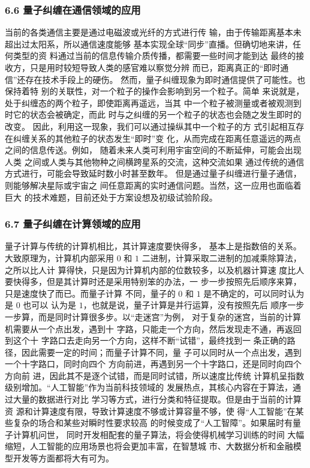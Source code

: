 \subsubsection{6.6 量子纠缠在通信领域的应用}
当前的各类通信主要是通过电磁波或光纤的方式进行传 输，由于传输距离基本未超出过太阳系，所以通信速度能够 基本实现全球“同步”直播。但确切地来讲，任何类型的资 料通过当前的信息传输介质传播，都需要一些时间才能到达 最终的接收方，只是用时较短导致人类的感官难以察觉分辨 而已，距离真正的“即时通信”还存在技术手段上的硬伤。 然而，量子纠缠现象为即时通信提供了可能性。也保持着特 别的关联性，对一个粒子的操作会影响到另一个粒子。简单 来说就是，处于纠缠态的两个粒子，即使距离再遥远，当其 中一个粒子被测量或者被观测到时它的状态会被确定，而此 时与之纠缠的另一个粒子的状态也会随之发生即时的改变。 因此，利用这一现象，我们可以通过操纵其中一个粒子的方 式引起相互存在纠缠关系的其他粒子的状态发生“即时”变 化，从而完成在距离任意遥远的两点之间的信息传送。例如， 随着未来人类可利用宇宙空间的不断延伸，可能会出现人类 之间或人类与其他物种之间横跨星系的交流，这种交流如果 通过传统的通信方式进行，可能会导致延时数小时甚至数年。 但是通过量子纠缠进行量子通信，则能够解决星际或宇宙之 间任意距离的实时通信问题。当然，这一应用也面临着巨大 的技术难题，目前还处于方案设想及初级试验阶段。

\subsubsection{6.7 量子纠缠在计算领域的应用}
量子计算与传统的计算机相比，其计算速度要快得多， 基本上是指数倍的关系。大致原理为，计算机内部采用 $0$ 和 $1$ 二进制，计算采取二进制的加减乘除算法，之所以比人计 算得快，只是因为计算机内部的位数较多，以及机器计算速 度比人要快得多，但是其计算时还是采用特别笨的办法，一 步一步按照先后顺序来算，只是速度快了而已。而量子计算 不同，量子的 $0$ 和 $1$ 是不确定的，可以同时认为是 $0$ 也可以 认为是 $1$，也就是说，量子计算是并行运算，没有按照先后 顺序一步一步算，而是同时计算很多步。以“走迷宫”为例， 对于复杂的迷宫，当前的计算机需要从一个点出发，遇到十 字路，只能走一个方向，然后发现走不通，再返回到这个十 字路口去走向另一个方向，这样不断“试错”，最终找到一 条正确的路径，因此需要一定的时间；而量子计算不同，量 子可以同时从一个点出发，遇到一个十字路口，同时向四个 方向前进，再遇到另一个十字路口，还是同时向四个方向前 进，因此其不是逐个试错，而是同时试错，所以速度比传统 计算机呈指数级别增加。“人工智能”作为当前科技领域的 发展热点，其核心内容在于算法，通过大量的数据进行对比 学习等方式，进行分类和特征提取。但是由于当前的计算资 源和计算速度有限，导致计算速度不够或计算容量不够，使 得“人工智能”在某些复杂的场合和某些对瞬时性要求较高 的时候变成了“人工智障”。如果届时有量子计算机问世， 同时开发相配套的量子算法，将会使得机械学习训练的时间 大幅缩短，人工智能的应用场景也将会更加丰富，在智慧城 市、大数据分析和金融模型开发等方面都将大有可为。


